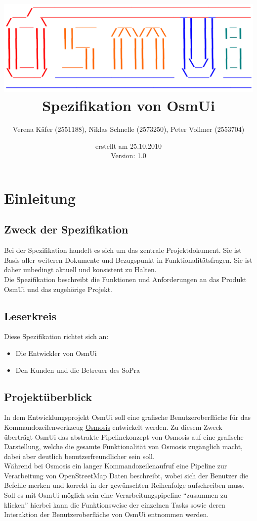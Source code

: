 \documentclass[a4paper,10pt]{scrartcl}
\author{Verena Käfer (2551188), Niklas Schnelle (2573250), Peter Vollmer (2553704)}
\date{erstellt am 25.10.2010\\
Version: 1.0}
\title{\includegraphics[width=15cm]{../projektplan/Logo_Osmui.png} \\ 
Spezifikation von OsmUi}
\begin{document}
\maketitle
\newpage
\tableofcontents
\newpage


\section{Einleitung}
\subsection{Zweck der Spezifikation}
Bei der Spezifikation handelt es sich um das zentrale Projektdokument. Sie ist Basis aller weiteren Dokumente und
Bezugspunkt in Funktionalitätsfragen. Sie ist daher unbedingt aktuell und konsistent zu Halten.\\
Die Spezifikation beschreibt die Funktionen und Anforderungen an das Produkt OsmUi und das zugehörige Projekt.
\subsection{Leserkreis}
Diese Spezifikation richtet sich an:
\begin{itemize}
 \item Die Entwickler von OsmUi
 \item Den Kunden und die Betreuer des SoPra
\end{itemize}

\subsection{Projektüberblick}
In dem Entwicklungsprojekt OsmUi soll eine grafische Benutzeroberfläche für das Kommandozeilenwerkzeug \href{http://wiki.openstreetmap.org/wiki/Osmosis}{Osmosis}
entwickelt werden. Zu diesem Zweck überträgt OsmUi das abstrakte Pipelinekonzept von Osmosis auf eine grafische Darstellung, welche die gesamte
Funktionalität von Osmosis zugänglich macht, dabei aber deutlich benutzerfreundlicher sein soll.\\
Während bei Osmosis ein langer Kommandozeilenaufruf eine Pipeline zur Verarbeitung von OpenStreetMap Daten beschreibt, wobei sich der Benutzer die Befehle merken
und korrekt in der gewünschten Reihenfolge aufschreiben muss.\\
Soll es mit OsmUi möglich sein eine Verarbeitungspipeline ``zusammen zu klicken'' hierbei kann die Funktionsweise der einzelnen Tasks sowie deren Interaktion
der Benutzeroberfläche von OsmUi entnommen werden.
\end{document}
